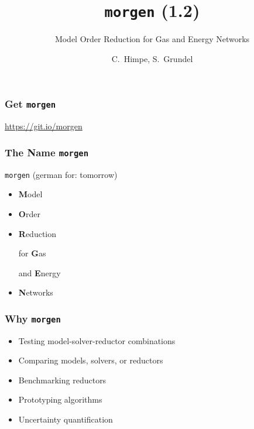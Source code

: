 \documentclass[%
aspectratio=43 %
,table %
]{beamer}
\title{\texttt{morgen} (1.2)}
\subtitle{Model Order Reduction for Gas and Energy Networks}
\author{C.~Himpe, S.~Grundel}
\institute{CSC}
\date{}
\begin{document}
\maketitle %


\begin{frame}\frametitle{Get \texttt{morgen}}

\begin{center}\Huge
 \alert{\url{https://git.io/morgen}}
\end{center}

\end{frame}


\begin{frame}\frametitle{The Name \texttt{morgen}}

\LARGE

\texttt{morgen} {\large(german for: tomorrow)}
\setlength{\leftmargini}{3.5em}
\begin{itemize}

 \item \textbf{M}odel

 \item \textbf{O}rder

 \item \textbf{R}eduction

 \item[for] \textbf{G}as

 \item[and] \textbf{E}nergy

 \item \textbf{N}etworks

\end{itemize}

\end{frame}


\begin{frame}\frametitle{Why \texttt{morgen}}

\Large

\begin{itemize}

 \item Testing model-solver-reductor combinations

 \item Comparing models, solvers, or reductors

 \item Benchmarking reductors

 \item Prototyping algorithms

 \item Uncertainty quantification

\end{itemize}

\end{frame}
\end{document}
